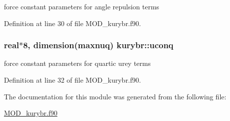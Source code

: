 force constant parameters for angle repulsion terms 



Definition at line 30 of file M\-O\-D\-\_\-kurybr.\-f90.

\hypertarget{classkurybr_a24fb0fa1a77c3ee4a9f23aab35600e6b}{
\subsubsection[{uconq}]{\setlength{\rightskip}{0pt plus 5cm}real$\ast$8, dimension({\bf maxnuq}) kurybr\-::uconq}}\label{classkurybr_a24fb0fa1a77c3ee4a9f23aab35600e6b}


force constant parameters for quartic urey terms 



Definition at line 32 of file M\-O\-D\-\_\-kurybr.\-f90.



The documentation for this module was generated from the following file\-:\begin{DoxyCompactItemize}
\item 
\hyperlink{MOD__kurybr_8f90}{M\-O\-D\-\_\-kurybr.\-f90}\end{DoxyCompactItemize}
